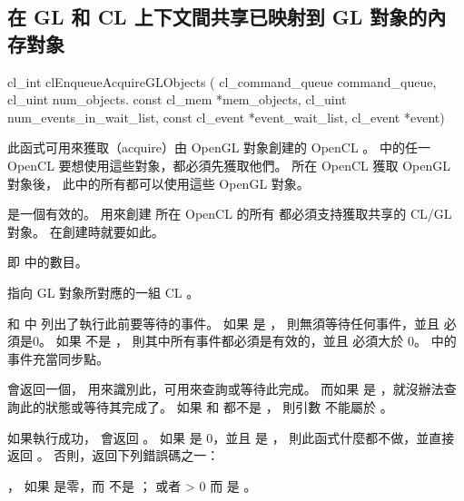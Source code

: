\subsection{在 GL 和 CL 上下文間共享已映射到 GL 對象的內存對象}


\startCLFUNC
cl_int clEnqueueAcquireGLObjects (
			cl_command_queue command_queue,
			cl_uint num_objects.
			const cl_mem *mem_objects,
			cl_uint num_events_in_wait_list,
			const cl_event *event_wait_list,
			cl_event *event)
\stopCLFUNC

此函式可用來獲取（acquire）由 OpenGL 對象創建的 OpenCL 。
中的任一 OpenCL 要想使用這些對象，都必須先獲取他們。
 所在 OpenCL 獲取 OpenGL 對象後，
此中的所有都可以使用這些 OpenGL 對象。

 是一個有效的。
用來創建  所在 OpenCL 的所有
都必須支持獲取共享的 CL/GL 對象。
在創建時就要如此。

 即  中的數目。

 指向 GL 對象所對應的一組 CL 。

 和  中
列出了執行此前要等待的事件。
如果  是 ，
則無須等待任何事件，並且  必須是0。
如果  不是 ，
則其中所有事件都必須是有效的，並且  必須大於 0。
 中的事件充當同步點。

 會返回一個，
用來識別此，可用來查詢或等待此完成。
而如果  是 ，就沒辦法查詢此的狀態或等待其完成了。
如果  和  都不是 ，
則引數  不能屬於 。

如果執行成功，  會返回 。
如果  是 0，並且  是 ，
則此函式什麼都不做，並直接返回 。
否則，返回下列錯誤碼之一：
\startigBase
\item {}，
如果  是零，而  不是 ；
或者  > 0 而  是 。

